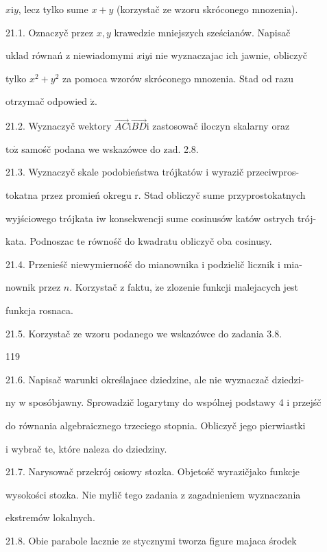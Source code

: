 \documentclass[a4paper,12pt]{article}
\begin{document}
$x\mathrm{i}y$, lecz tylko sume $x+y$ (korzystač ze wzoru skróconego mnozenia).

21.1. Oznaczyč przez $x, y$ krawedzie mniejszych sześcianów. Napisač

uklad równań $\mathrm{z}$ niewiadomymi $x\mathrm{i}y\mathrm{i}$ nie wyznaczajac ich jawnie, obliczyč

tylko $x^{2} +y^{2}$ za pomoca wzorów skróconego mnozenia. Stad od razu

otrzymač odpowied $\acute{\mathrm{z}}.$

21.2. Wyznaczyč wektory $\vec{AC}\mathrm{i}\vec{BD}\mathrm{i}$ zastosowač iloczyn skalarny oraz

$\mathrm{t}\mathrm{o}\dot{\mathrm{z}}$ samośč podana we wskazówce do $\mathrm{z}\mathrm{a}\mathrm{d}$. 2.8.

21.3. Wyznaczyč skale podobieństwa trójkatów i wyrazič przeciwpros-

tokatna przez promień okregu r. Stad obliczyč sume przyprostokatnych

wyjściowego trójkata iw konsekwencji sume cosinusów katów ostrych trój-

kata. Podnoszac te równośč do kwadratu obliczyč oba cosinusy.

21.4. Przenieśč niewymiernośč do mianownika $\mathrm{i}$ podzielič licznik $\mathrm{i}$ mia-

nownik przez $n$. Korzystač $\mathrm{z}$ faktu, $\dot{\mathrm{z}}\mathrm{e}$ zlozenie funkcji malejacych jest

funkcja rosnaca.

21.5. Korzystač ze wzoru podanego we wskazówce do zadania 3.8.





119

21.6. Napisač warunki określajace dziedzine, ale nie wyznaczač dziedzi-

ny w sposóbjawny. Sprowadzič logarytmy do wspólnej podstawy 4 i przejśč

do równania algebraicznego trzeciego stopnia. Obliczyč jego pierwiastki

i wybrač te, które naleza do dziedziny.

21.7. Narysowač przekrój osiowy stozka. Objetośč wyrazičjako funkcje

wysokości stozka. Nie mylič tego zadania z zagadnieniem wyznaczania

ekstremów lokalnych.

21.8. Obie parabole lacznie ze stycznymi tworza figure majaca środek
\end{document}
